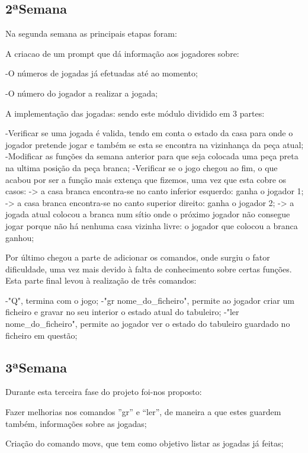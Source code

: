 \subsection*{2ª\+Semana}

Na segunda semana as principais etapas foram\+:

A criacao de um prompt que dá informação aos jogadores sobre\+:

-\/O números de jogadas já efetuadas até ao momento;

-\/O número do jogador a realizar a jogada;

A implementação das jogadas\+: sendo este módulo dividido em 3 partes\+: \begin{DoxyVerb}-Verificar se uma jogada é valida, tendo em conta o estado da casa para onde o jogador pretende jogar e também se esta se  encontra na vizinhança da peça atual;
    -Modificar as funções da semana anterior para que seja colocada uma peça preta na ultima posição da peça branca;
    -Verificar se o jogo chegou ao fim, o que acabou por ser a função mais extença que fizemos, uma vez que esta cobre os casos:
    -> a casa branca encontra-se no canto inferior esquerdo: ganha o jogador 1;
        -> a casa branca encontra-se no canto superior direito: ganha o jogador 2;
    -> a jogada atual colocou a branca num sítio onde o próximo jogador não consegue jogar porque não há nenhuma casa  vizinha livre: o jogador que colocou a branca ganhou;
\end{DoxyVerb}


Por último chegou a parte de adicionar os comandos, onde surgiu o fator dificuldade, uma vez mais devido à falta de conhecimento sobre certas funções. Esta parte final levou à realização de três comandos\+: \begin{DoxyVerb}-"Q", termina com o jogo;
-"gr nome_do_ficheiro", permite ao jogador criar um ficheiro e gravar no seu interior o estado atual do tabuleiro;
-"ler nome_do_ficheiro", permite ao jogador ver o estado do tabuleiro guardado no ficheiro em questão;
\end{DoxyVerb}


\subsection*{3ª\+Semana}

Durante esta terceira fase do projeto foi-\/nos proposto\+:
\begin{DoxyItemize}
\item Fazer melhorias nos comandos ”gr” e “ler”, de maneira a que estes guardem também, informações sobre as jogadas;
\item Criação do comando movs, que tem como objetivo listar as jogadas já feitas;
\end{DoxyItemize}

